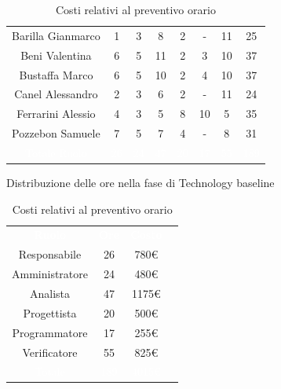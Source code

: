 \begin{table}[h!]
\begin{minipage}[c]{0.53\textwidth}
\begin{tabular}{>{\raggedright\arraybackslash}c|cccccc|c}
		\rowcolor[RGB]{216, 235, 171}
	    	Barilla Gianmarco & 1 & 3 & 8 & 2 & - & 11& 25		\\[4pt]
	    \rowcolor[RGB]{233, 245, 206}
	    	Beni Valentina & 6 & 5 & 11 & 2 & 3 & 10& 37			\\[4pt]
	    \rowcolor[RGB]{216, 235, 171}
	    	Bustaffa Marco & 6 & 5 & 10 & 2 & 4 & 10& 37			\\[4pt]
        \rowcolor[RGB]{233, 245, 206}
	    	Canel Alessandro & 2 & 3 & 6 & 2 & - & 11& 24			\\[4pt]
        \rowcolor[RGB]{216, 235, 171}
	    	Ferrarini Alessio & 4 & 3 & 5 & 8 & 10 & 5& 35		\\[4pt]
        \rowcolor[RGB]{233, 245, 206}
	    	Pozzebon Samuele & 7 & 5 & 7 & 4 & - & 8& 31			\\[4pt]
		\rowcolor[RGB]{47, 106, 73}
			\textcolor{white}{Totale Ruolo} & \textcolor{white}{26} & \textcolor{white}{24} & \textcolor{white}{47} 
			& \textcolor{white}{20} & \textcolor{white}{17} & \textcolor{white}{55}
			& \textcolor{white}{189} \\[4pt]	
    \end{tabular}
    \caption{Distribuzione delle ore nella fase di Technology baseline}
\end{minipage}
\hfill
\begin{minipage}{0.33\textwidth}
	\centering
	\begin{tabular}{cccc}
	    \rowcolor[RGB]{33, 73, 50}
	    \textcolor{white}{\textbf{Ruolo}} & \textcolor{white}{\textbf{Ore}} & \textcolor{white}{\textbf{Costo}}\\[4pt]
	    \rowcolor[RGB]{216, 235, 171}
	    Responsabile & 26 & 780\euro\\[4pt]
	    \rowcolor[RGB]{233, 245, 206}
	    Amministratore & 24 & 480\euro\\[4pt]
        \rowcolor[RGB]{216, 235, 171}
	    Analista & 47 & 1175\euro\\[4pt]
	    \rowcolor[RGB]{233, 245, 206}
	    Progettista & 20 & 500\euro\\[4pt]
        \rowcolor[RGB]{216, 235, 171}
	    Programmatore & 17 & 255\euro\\[4pt]
	    \rowcolor[RGB]{233, 245, 206}
	    Verificatore & 55 & 825\euro\\[4pt]
		\rowcolor[RGB]{47, 106, 73}
			\textcolor{white}{Totale} & \textcolor{white}{189} & \textcolor{white}{4015\euro}\\[4pt]	
    \end{tabular}	
	\caption{Costi relativi al preventivo orario}

\end{minipage}
\end{table}

\setlength\extrarowheight{0pt}



